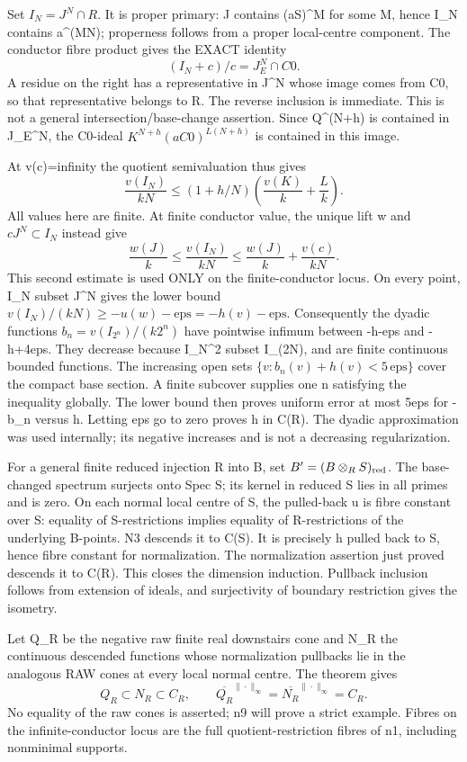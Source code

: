 \documentclass[11pt]{article}
\begin{document}
Set \(I_N=J^N\cap R\). It is proper primary: J contains (aS)\textasciicircum{}M for some M, hence I\_N contains a\textasciicircum{}(MN); properness follows from a proper local-centre component. The conductor fibre product gives the EXACT identity
\[
 (I_N+c)/c=J_E^N\cap C0.
\]
A residue on the right has a representative in J\textasciicircum{}N whose image comes from C0, so that representative belongs to R. The reverse inclusion is immediate. This is not a general intersection/base-change assertion. Since Q\textasciicircum{}(N+h) is contained in J\_E\textasciicircum{}N, the C0-ideal \(K^{N+h}(aC0)^{L(N+h)}\) is contained in this image.

At v(c)=infinity the quotient semivaluation thus gives
\[
 \frac{v(I_N)}{kN}\le(1+h/N)\left(\frac{v(K)}k+\frac Lk\right).
\]
All values here are finite. At finite conductor value, the unique lift w and \(cJ^N\subset I_N\) instead give
\[
 \frac{w(J)}k\le\frac{v(I_N)}{kN}\le\frac{w(J)}k+\frac{v(c)}{kN}.
\]
This second estimate is used ONLY on the finite-conductor locus. On every point, I\_N subset J\textasciicircum{}N gives the lower bound \(v(I_N)/(kN)\ge-u(w)-\mathrm{eps}=-h(v)-\mathrm{eps}\). Consequently the dyadic functions \(b_n=v(I_{2^n})/(k2^n)\) have pointwise infimum between -h-eps and -h+4eps. They decrease because I\_N\textasciicircum{}2 subset I\_(2N), and are finite continuous bounded functions. The increasing open sets \(\{v:b_n(v)+h(v)<5\,\mathrm{eps}\}\) cover the compact base section. A finite subcover supplies one n satisfying the inequality globally. The lower bound then proves uniform error at most 5eps for -b\_n versus h. Letting eps go to zero proves h in C(R). The dyadic approximation was used internally; its negative increases and is not a decreasing regularization.

For a general finite reduced injection R into B, set \(B'=(B\otimes_R S)_{\rm red}\). The base-changed spectrum surjects onto Spec S; its kernel in reduced S lies in all primes and is zero. On each normal local centre of S, the pulled-back u is fibre constant over S: equality of S-restrictions implies equality of R-restrictions of the underlying B-points. N3 descends it to C(S). It is precisely h pulled back to S, hence fibre constant for normalization. The normalization assertion just proved descends it to C(R). This closes the dimension induction. Pullback inclusion follows from extension of ideals, and surjectivity of boundary restriction gives the isometry.

Let Q\_R be the negative raw finite real downstairs cone and N\_R the continuous descended functions whose normalization pullbacks lie in the analogous RAW cones at every local normal centre. The theorem gives
\[
 Q_R\subset N_R\subset C_R,\qquad
 \overline{Q_R}^{\|\cdot\|_\infty}=\overline{N_R}^{\|\cdot\|_\infty}=C_R.
\]
No equality of the raw cones is asserted; n9 will prove a strict example. Fibres on the infinite-conductor locus are the full quotient-restriction fibres of n1, including nonminimal supports.
\end{document}
